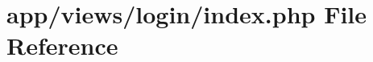 \hypertarget{app_2views_2login_2index_8php}{}\section{app/views/login/index.php File Reference}
\label{app_2views_2login_2index_8php}
